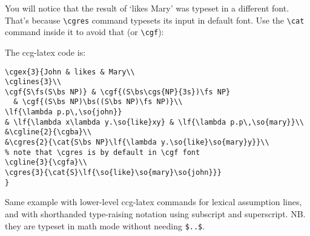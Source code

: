 \documentclass[11pt]{article}
\begin{document}
You will notice that the result of `likes Mary' was typeset in a different font.
That's because \verb|\cgres| command typesets its input in default font.
Use the \verb|\cat| command inside it to avoid that (or \verb|\cgf|):

\medskip\bigskip

The ccg-latex code is:

\begin{verbatim}
\cgex{3}{John & likes & Mary\\
\cglines{3}\\
\cgf{S\fs(S\bs NP)} & \cgf{(S\bs\cgs{NP}{3s})\fs NP} 
  & \cgf{(S\bs NP)\bs((S\bs NP)\fs NP)}\\
\lf{\lambda p.p\,\so{john}} 
& \lf{\lambda x\lambda y.\so{like}xy} & \lf{\lambda p.p\,\so{mary}}\\
&\cgline{2}{\cgba}\\
&\cgres{2}{\cat{S\bs NP}\lf{\lambda y.\so{like}\so{mary}y}}\\  
% note that \cgres is by default in \cgf font
\cgline{3}{\cgfa}\\
\cgres{3}{\cat{S}\lf{\so{like}\so{mary}\so{john}}}
}
\end{verbatim}


\newpage
Same example with lower-level ccg-latex commands for lexical assumption lines, and with shorthanded 
type-raising notation using subscript and superscript. NB. they are typeset in math mode without needing \verb|$..$|.\bigskip

\bigskip
\end{document}
